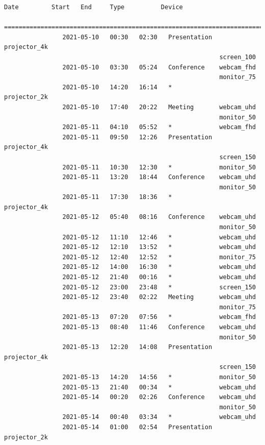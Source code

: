 \documentclass{article}
\begin{document}
\begin{Verbatim}[gobble=8]
                Date         Start   End     Type          Device
                ===========================================================================
                2021-05-10   00:30   02:30   Presentation  projector_4k
                                                           screen_100
                2021-05-10   03:30   05:24   Conference    webcam_fhd
                                                           monitor_75
                2021-05-10   14:20   16:14   *             projector_2k
                2021-05-10   17:40   20:22   Meeting       webcam_uhd
                                                           monitor_50
                2021-05-11   04:10   05:52   *             webcam_fhd
                2021-05-11   09:50   12:26   Presentation  projector_4k
                                                           screen_150
                2021-05-11   10:30   12:30   *             monitor_50
                2021-05-11   13:20   18:44   Conference    webcam_uhd
                                                           monitor_50
                2021-05-11   17:30   18:36   *             projector_4k
                2021-05-12   05:40   08:16   Conference    webcam_uhd
                                                           monitor_50
                2021-05-12   11:10   12:46   *             webcam_uhd
                2021-05-12   12:10   13:52   *             webcam_uhd
                2021-05-12   12:40   12:52   *             monitor_75
                2021-05-12   14:00   16:30   *             webcam_uhd
                2021-05-12   21:40   00:16   *             webcam_uhd
                2021-05-12   23:00   23:48   *             screen_150
                2021-05-12   23:40   02:22   Meeting       webcam_uhd
                                                           monitor_75
                2021-05-13   07:20   07:56   *             webcam_fhd
                2021-05-13   08:40   11:46   Conference    webcam_uhd
                                                           monitor_50
                2021-05-13   12:20   14:08   Presentation  projector_4k
                                                           screen_150
                2021-05-13   14:20   14:56   *             monitor_50
                2021-05-13   21:40   00:34   *             webcam_uhd
                2021-05-14   00:20   02:26   Conference    webcam_uhd
                                                           monitor_50
                2021-05-14   00:40   03:34   *             webcam_uhd
                2021-05-14   01:00   02:54   Presentation  projector_2k

\end{Verbatim}
\end{document}
